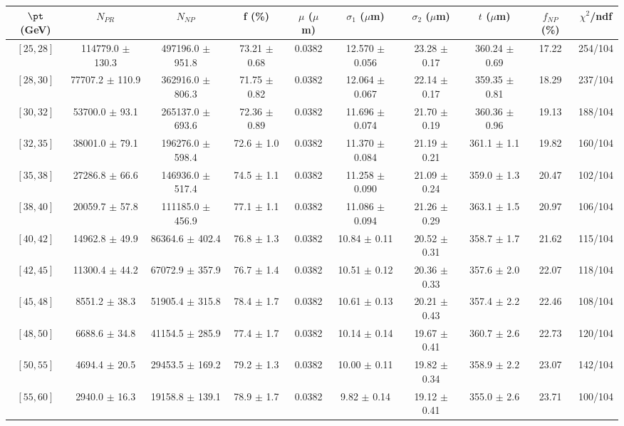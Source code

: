 \begin{tabular}{c||c|c|c|c|c|c|c||c|c}
$\pt$ (GeV) & $N_{PR}$ & $N_{NP}$ & f (\%) & $\mu$ ($\mu$m) & $\sigma_1$ ($\mu$m) & $\sigma_2$ ($\mu$m)  & $t$ ($\mu$m) & $f_{NP}$ (\%) & $\chi^2$/ndf \\
\hline
$[25, 28]$ & 114779.0 $\pm$ 130.3 & 497196.0 $\pm$ 951.8 & 73.21 $\pm$ 0.68 & 0.0382 & 12.570 $\pm$ 0.056 & 23.28 $\pm$ 0.17 & 360.24 $\pm$ 0.69 & 17.22 & 254/104\\
$[28, 30]$ & 77707.2 $\pm$ 110.9 & 362916.0 $\pm$ 806.3 & 71.75 $\pm$ 0.82 & 0.0382 & 12.064 $\pm$ 0.067 & 22.14 $\pm$ 0.17 & 359.35 $\pm$ 0.81 & 18.29 & 237/104\\
$[30, 32]$ & 53700.0 $\pm$ 93.1 & 265137.0 $\pm$ 693.6 & 72.36 $\pm$ 0.89 & 0.0382 & 11.696 $\pm$ 0.074 & 21.70 $\pm$ 0.19 & 360.36 $\pm$ 0.96 & 19.13 & 188/104\\
$[32, 35]$ & 38001.0 $\pm$ 79.1 & 196276.0 $\pm$ 598.4 & 72.6 $\pm$ 1.0 & 0.0382 & 11.370 $\pm$ 0.084 & 21.19 $\pm$ 0.21 & 361.1 $\pm$ 1.1 & 19.82 & 160/104\\
$[35, 38]$ & 27286.8 $\pm$ 66.6 & 146936.0 $\pm$ 517.4 & 74.5 $\pm$ 1.1 & 0.0382 & 11.258 $\pm$ 0.090 & 21.09 $\pm$ 0.24 & 359.0 $\pm$ 1.3 & 20.47 & 102/104\\
$[38, 40]$ & 20059.7 $\pm$ 57.8 & 111185.0 $\pm$ 456.9 & 77.1 $\pm$ 1.1 & 0.0382 & 11.086 $\pm$ 0.094 & 21.26 $\pm$ 0.29 & 363.1 $\pm$ 1.5 & 20.97 & 106/104\\
$[40, 42]$ & 14962.8 $\pm$ 49.9 & 86364.6 $\pm$ 402.4 & 76.8 $\pm$ 1.3 & 0.0382 & 10.84 $\pm$ 0.11 & 20.52 $\pm$ 0.31 & 358.7 $\pm$ 1.7 & 21.62 & 115/104\\
$[42, 45]$ & 11300.4 $\pm$ 44.2 & 67072.9 $\pm$ 357.9 & 76.7 $\pm$ 1.4 & 0.0382 & 10.51 $\pm$ 0.12 & 20.36 $\pm$ 0.33 & 357.6 $\pm$ 2.0 & 22.07 & 118/104\\
$[45, 48]$ & 8551.2 $\pm$ 38.3 & 51905.4 $\pm$ 315.8 & 78.4 $\pm$ 1.7 & 0.0382 & 10.61 $\pm$ 0.13 & 20.21 $\pm$ 0.43 & 357.4 $\pm$ 2.2 & 22.46 & 108/104\\
$[48, 50]$ & 6688.6 $\pm$ 34.8 & 41154.5 $\pm$ 285.9 & 77.4 $\pm$ 1.7 & 0.0382 & 10.14 $\pm$ 0.14 & 19.67 $\pm$ 0.41 & 360.7 $\pm$ 2.6 & 22.73 & 120/104\\
$[50, 55]$ & 4694.4 $\pm$ 20.5 & 29453.5 $\pm$ 169.2 & 79.2 $\pm$ 1.3 & 0.0382 & 10.00 $\pm$ 0.11 & 19.82 $\pm$ 0.34 & 358.9 $\pm$ 2.2 & 23.07 & 142/104\\
$[55, 60]$ & 2940.0 $\pm$ 16.3 & 19158.8 $\pm$ 139.1 & 78.9 $\pm$ 1.7 & 0.0382 & 9.82 $\pm$ 0.14 & 19.12 $\pm$ 0.41 & 355.0 $\pm$ 2.6 & 23.71 & 100/104\\

\end{tabular}
